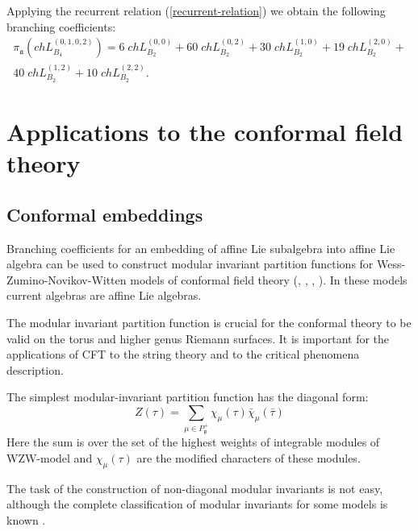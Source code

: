 \documentclass[a4paper,12pt]{article}
\theoremstyle{definition} \newtheorem{Def}{Definition}
\begin{document}
Applying the recurrent relation (\ref{recurrent-relation}) we obtain the
following branching coefficients:
\begin{multline}
  \label{eq:24}
  \pi_{\mathfrak{a}} \left(ch L^{(0,1,0,2)}_{B_4}\right) = 6 \; ch L^{(0,0)}_{B_2}+ 60
  \; ch L_{B_2}^{(0,2)}+ 30 \; ch L_{B_2}^{(1,0)}+ 19 \; ch L_{B_2}^{(2,0)}+\\
  40 \; ch L_{B_2}^{(1,2)}+ 10 \; ch L_{B_2}^{(2,2)}.
\end{multline}

\section{Applications to the conformal field theory}
\label{sec:phys-appl}

\subsection{Conformal embeddings}
\label{sec:conformal-embeddings}

Branching coefficients for an embedding of affine Lie subalgebra into
affine Lie algebra can be used to construct modular invariant
partition functions for Wess-Zumino-Novikov-Witten models of conformal field theory (\cite{difrancesco1997cft}, \cite{Walton:1999xc}, \cite{walton1989conformal}, \cite{schellekens1986conformal}). In these models current algebras are affine Lie algebras.

The modular invariant partition function is crucial for the conformal theory to be valid on the torus and higher genus Riemann surfaces. It is important for the applications of CFT to the string theory and to the critical phenomena description. 

The simplest modular-invariant partition function has the diagonal form:
\begin{equation}
  \label{eq:34}
   Z(\tau)=\sum_{ \mu\in P^{+}_{\mathfrak{g}}} \chi_{\mu}(\tau)\bar \chi_{\mu}(\bar \tau)
\end{equation}
Here the sum is over the set of the highest weights of integrable modules of WZW-model and $\chi_{\mu}(\tau)$ are the modified characters of these modules. 

The task of the construction of non-diagonal modular invariants is not easy, although the complete classification of modular invariants for some models is known \cite{1994hepthGannon,1995JMPGannon}.
\end{document}
